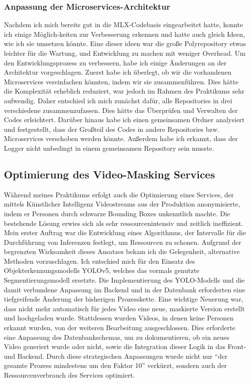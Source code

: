 \documentclass[11pt]{article}
\begin{document}
\subsubsection{Anpassung der Microservices-Architektur}
Nachdem ich mich bereits gut in die MLX-Codebasis eingearbeitet hatte, konnte ich einige Möglich-keiten zur Verbesserung erkennen und hatte auch gleich Ideen, wie ich sie umsetzen könnte. Eine dieser ideen war die große Polyrepository etwas leichter für die Wartung, und Entwicklung zu machen mit weniger Overhead. Um den Entwicklungsprozess zu verbessern, habe ich einige Änderungen an der Architektur vorgeschlagen. Zuerst habe ich überlegt, ob wir die vorhandenen Microservices vereinfachen könnten, indem wir sie zusammenführen. Dies hätte die Komplexität erheblich reduziert, war jedoch im Rahmen des Praktikums sehr aufwendig. Daher entschied ich mich zunächst dafür, alle Repositories in drei verschiedene zusammenzufassen. Dies hätte das Überprüfen und Verwalten der Codes erleichtert. Darüber hinaus habe ich einen gemeinsamen Ordner analysiert und festgestellt, dass der Großteil des Codes in andere Repositories bzw. Microservices verschoben werden könnte. Außerdem habe ich erkannt, dass der Logger nicht unbedingt in einem gemeinsamen Repository sein musste.

\subsection{Optimierung des Video-Masking Services}
Während meines Praktikums erfolgt auch die Optimierung eines Services, der mittels Künstlicher Intelligenz Videostreams aus der Produktion anonymisierte, indem er Personen durch schwarze Bounding Boxes unkenntlich machte. Die bestehende Lösung erwies sich als sehr ressourcenintensiv und zeitlich ineffizient. Mein erster Auftrag war die Entwicklung eines Algorithmus, der Intervalle für die Durchführung von Inferenzen festlegt, um Ressourcen zu schonen. Aufgrund der begrenzten Wirksamkeit dieses Ansatzes bekam ich die Gelegenheit, alternative Methoden vorzuschlagen. Ich entschied mich für den Einsatz des Objekterkennungsmodells YOLOv5, welches das vormals genutzte Segmentierungsmodell ersetzte.
\newline
Die Implementierung des YOLO-Modells und die damit verbundene Anpassung im Backend und in der Datenbank erforderten eine tiefgreifende Änderung der bisherigen Prozesskette. Eine wichtige Neuerung war, dass nicht mehr automatisch für jedes Video eine neue, maskierte Version erstellt und hochgeladen wurde. Stattdessen wurden Videos, in denen keine Personen erkannt wurden, von der weiteren Bearbeitung ausgeschlossen. Dies erforderte eine Anpassung des Datenbankschemas, um zu dokumentieren, ob ein neues Video generiert wurde oder nicht, sowie die Integration dieser Logik in das Front- und Backend. Durch diese strategischen Anpassungen wurde nicht nur ``der gesamte Prozess mindestens um den Faktor 10'' verkürzt, sondern auch der Ressourcenverbrauch des Services optimiert.
\end{document}
